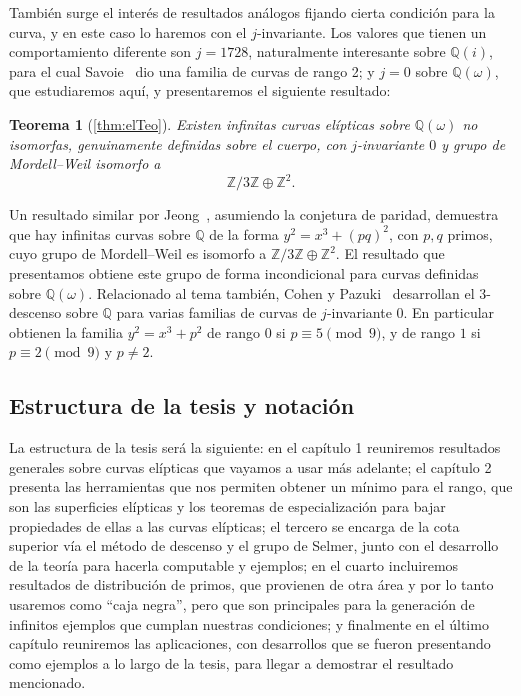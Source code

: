\documentclass[a4paper]{book}
\theoremstyle{definition}
\theoremstyle{plain}
\newtheorem*{theorem*}{Teorema}
\newcommand{\nbd}{\nobreakdash}
\newcommand{\QQ}{\mathbb{Q}}
\newcommand{\ZZ}{\mathbb{Z}}
\begin{document}
También surge el interés de resultados análogos fijando cierta condición para la curva, y en este caso lo haremos con el $j$-invariante. Los valores que tienen un comportamiento diferente son $j=1728$, naturalmente interesante sobre $\QQ(i)$, para el cual Savoie~\cite{Savoie2025QiRank2} dio una familia de curvas de rango 2; y $j=0$ sobre $\QQ(\omega)$, que estudiaremos aquí, y presentaremos el siguiente resultado:

\begin{theorem*}[\ref{thm:elTeo}]
Existen infinitas curvas elípticas sobre $\QQ(\omega)$ no isomorfas, genuinamente definidas sobre el cuerpo, con $j$-invariante $0$ y grupo de Mordell--Weil isomorfo a
\[
\ZZ/3\ZZ\oplus\ZZ^2.
\]
\end{theorem*}

Un resultado similar por Jeong~\cite{Jeong2019RankTwo}, asumiendo la conjetura de paridad, demuestra que hay infinitas curvas sobre $\QQ$ de la forma $y^2=x^3+{(pq)}^2$, con $p,q$ primos, cuyo grupo de Mordell--Weil es isomorfo a $\ZZ/3\ZZ\oplus\ZZ^2$. El resultado que presentamos obtiene este grupo de forma incondicional para curvas definidas sobre $\QQ(\omega)$. Relacionado al tema también, Cohen y Pazuki~\cite{CohenPazuki2009} desarrollan el $3$\nbd-descenso sobre $\QQ$ para varias familias de curvas de $j$\nbd-invariante $0$. En particular obtienen la familia $y^2=x^3+p^2$ de rango $0$ si $p\equiv 5\pmod{9}$, y de rango $1$ si $p\equiv 2\pmod{9}$ y $p\neq2$. 

\subsection*{Estructura de la tesis y notación}

La estructura de la tesis será la siguiente: en el capítulo 1 reuniremos resultados generales sobre curvas elípticas que vayamos a usar más adelante; el capítulo 2 presenta las herramientas que nos permiten obtener un mínimo para el rango, que son las superficies elípticas y los teoremas de especialización para bajar propiedades de ellas a las curvas elípticas; el tercero se encarga de la cota superior vía el método de descenso y el grupo de Selmer, junto con el desarrollo de la teoría para hacerla computable y ejemplos; en el cuarto incluiremos resultados de distribución de primos, que provienen de otra área y por lo tanto usaremos como ``caja negra'', pero que son principales para la generación de infinitos ejemplos que cumplan nuestras condiciones; y finalmente en el último capítulo reuniremos las aplicaciones, con desarrollos que se fueron presentando como ejemplos a lo largo de la tesis, para llegar a demostrar el resultado mencionado.
\end{document}

